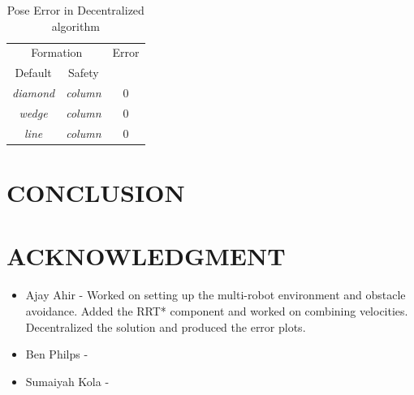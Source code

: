 \documentclass[letterpaper, 10 pt, conference]{ieeeconf}  %
\begin{document}
\begin{table}[h]
\begin{center}
\begin{tabular}{|c c|c|}
\hline
\multicolumn{2}{|c|}{Formation} & Error \\
Default & Safety & \\
\hline
\textit{diamond}    & \textit{column} & 0 \\
\textit{wedge}       & \textit{column} & 0 \\
\textit{line}           & \textit{column} & 0 \\
\hline
\end{tabular}
\end{center}
\caption{Pose Error in Decentralized algorithm}
\label{table_results_decentralized}
\end{table}

\section{CONCLUSION}

\addtolength{\textheight}{-12cm}   %

\section{ACKNOWLEDGMENT}

\begin{itemize}
\item Ajay Ahir - Worked on setting up the multi-robot environment and obstacle avoidance. Added the RRT* component and worked on combining velocities. Decentralized the solution and produced the error plots.

\item Ben Philps - 

\item Sumaiyah Kola - 
\end{itemize}
\end{document}
